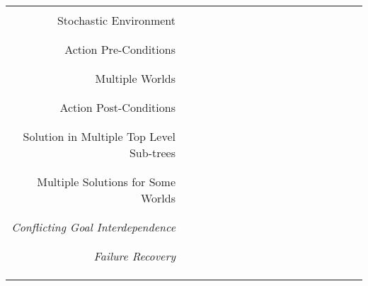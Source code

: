 \documentclass[landscape,a4paper,title page]{article}
\newcommand{\x}{{\checked}}
\begin{document}
\begin{table}[!htb]
\begin{tabular}{ r | c  c  c  c  c  c  c  c  c  c  c  c  c  c  c  c }
  \\ \hline \\
  Stochastic Environment & \x & \x & \x & \x & \x & \x & \x & \x & \x & \x & \x & \x & \x & \x & \x \\
  \\ \hline \\
  Action Pre-Conditions & \x & \x & \x & \x & \x & \x & \x & \x & \x & \x & \x & \x & \x & \x & \x \\
  \\ \hline \\
  Multiple Worlds &   &   &   &   &   & \x & \x & \x & \x & \x & \x & \x & \x & \x & \x \\
  \\ \hline \\
  Action Post-Conditions &   &   &   &   &   & \x & \x & \x & \x & \x & \x &   & \x &   &   \\
  \\ \hline \\
  Solution in Multiple Top Level Sub-trees &   &   &   &   &   &   &   &   &   &   &   &   & \x & \x & \x  \\
  \\ \hline \\
  Multiple Solutions for Some Worlds &   &   &   &   &   &   &   &   &   &   &   &   &   &   & \x \\
  \\ \hline \\
  \textit{Conflicting Goal Interdependence} &   &   &   &   &   &   &   &   &   &   &   &   &   &   &   \\
  \\ \hline \\
  \textit{Failure Recovery} &   &   &   &   &   &   &   &   &   &   &   &   &   &   &   \\
  \\ \hline \\ \\
  \end{tabular}
  \label{tab:perofrmanceFactors}
\end{table}
\end{document}

